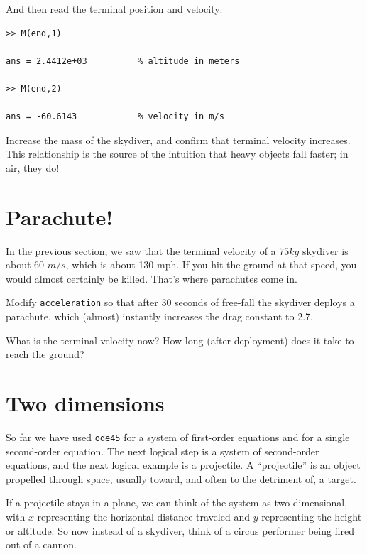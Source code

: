 \documentclass{book}
\begin{document}
And then read the terminal position and velocity:

\begin{verbatim}
>> M(end,1)

ans = 2.4412e+03          % altitude in meters

>> M(end,2)

ans = -60.6143            % velocity in m/s
\end{verbatim}

\begin{ex}
Increase the mass of the skydiver, and confirm that
terminal velocity increases.  This relationship is the source of the
intuition that heavy objects fall faster; in air, they do!
\end{ex}


\section{Parachute!}

In the previous section, we saw that the terminal velocity of a $75
kg$ skydiver is about 60 $m/s$, which is about 130 mph.  If you hit
the ground at that speed, you would almost certainly be killed.
That's where parachutes come in.

\begin{ex}
Modify {\tt acceleration} so that after 30 seconds of
free-fall the skydiver deploys a parachute, which (almost) instantly
increases the drag constant to 2.7.

What is the terminal velocity now?  How long (after deployment) does
it take to reach the ground?
\end{ex}


\section{Two dimensions}
\label{projectile}

So far we have used {\tt ode45} for a system of first-order
equations and for a single second-order equation.  The next logical
step is a system of second-order equations, and the next logical example
is a projectile.  A ``projectile'' is an object propelled
through space, usually toward,
and often to the detriment of,
a target.

If a projectile stays in a plane, we can think of the system as
two-dimensional, with $x$ representing the horizontal distance
traveled and $y$ representing the height or altitude.  So now
instead of a skydiver, think of a circus performer being fired
out of a cannon.
\end{document}
